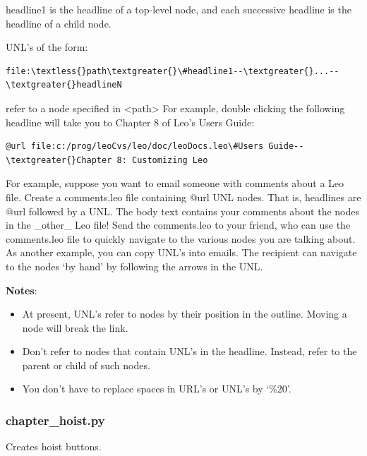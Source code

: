 \documentclass[a4paper,10pt,english]{sphinxmanual}
\begin{document}
headline1 is the headline of a top-level node, and each successive headline is
the headline of a child node.

UNL's of the form:

\begin{Verbatim}[commandchars=\\\{\}]
file:\textless{}path\textgreater{}\#headline1--\textgreater{}...--\textgreater{}headlineN
\end{Verbatim}

refer to a node specified in \textless{}path\textgreater{} For example, double clicking the following
headline will take you to Chapter 8 of Leo's Users Guide:

\begin{Verbatim}[commandchars=\\\{\}]
@url file:c:/prog/leoCvs/leo/doc/leoDocs.leo\#Users Guide--\textgreater{}Chapter 8: Customizing Leo
\end{Verbatim}

For example, suppose you want to email someone with comments about a Leo file.
Create a comments.leo file containing @url UNL nodes. That is, headlines are
@url followed by a UNL. The body text contains your comments about the nodes in
the \_other\_ Leo file! Send the comments.leo to your friend, who can use the
comments.leo file to quickly navigate to the various nodes you are talking
about. As another example, you can copy UNL's into emails. The recipient can
navigate to the nodes `by hand' by following the arrows in the UNL.

\textbf{Notes}:
\begin{itemize}
\item {} 
At present, UNL's refer to nodes by their position in the outline. Moving a
node will break the link.

\item {} 
Don't refer to nodes that contain UNL's in the headline. Instead, refer to the
parent or child of such nodes.

\item {} 
You don't have to replace spaces in URL's or UNL's by `\%20'.

\end{itemize}


\subsubsection{chapter\_hoist.py}
\label{plugins:chapter-hoist-py}
Creates hoist buttons.
\end{document}
